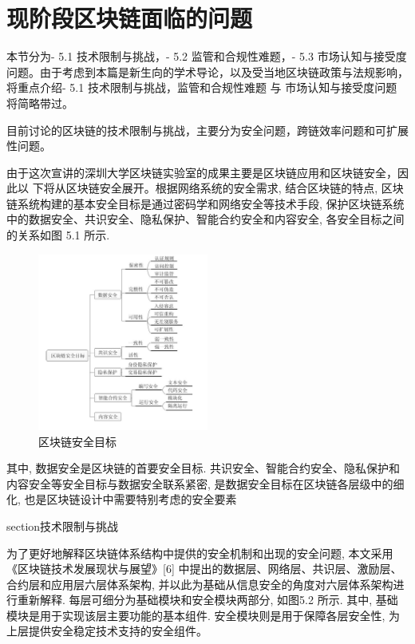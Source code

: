 
\chapter{现阶段区块链面临的问题}

本节分为- 5.1 技术限制与挑战，- 5.2 监管和合规性难题，- 5.3 市场认知与接受度问题。由于考虑到本篇是新生向的学术导论，以及受当地区块链政策与法规影响，将重点介绍- 5.1 技术限制与挑战，监管和合规性难题 与 市场认知与接受度问题 将简略带过。

目前讨论的区块链的技术限制与挑战，主要分为安全问题，跨链效率问题和可扩展性问题。

由于这次宣讲的深圳大学区块链实验室的成果主要是区块链应用和区块链安全，因此以 下将从区块链安全展开。根据网络系统的安全需求, 结合区块链的特点, 区块链系统构建的基本安全目标是通过密码学和网络安全等技术手段, 保护区块链系统中的数据安全、共识安全、隐私保护、智能合约安全和内容安全, 各安全目标之间的关系如图 5.1 所示. 

\begin{figure}
	\centering
	\includegraphics[width=0.5\textwidth]{img/1.png}
	\caption{区块链安全目标}
	\label{fig:example}
\end{figure}

其中, 数据安全是区块链的首要安全目标. 共识安全、智能合约安全、隐私保护和内容安全等安全目标与数据安全联系紧密, 是数据安全目标在区块链各层级中的细化, 也是区块链设计中需要特别考虑的安全要素


section{技术限制与挑战}

为了更好地解释区块链体系结构中提供的安全机制和出现的安全问题, 本文采用《区块链技术发展现状与展望》[6] 中提出的数据层、网络层、共识层、激励层、合约层和应用层六层体系架构, 并以此为基础从信息安全的角度对六层体系架构进行重新解释. 每层可细分为基础模块和安全模块两部分, 如图5.2 所示. 其中, 基础模块是用于实现该层主要功能的基本组件. 安全模块则是用于保障各层安全性, 为上层提供安全稳定技术支持的安全组件。

